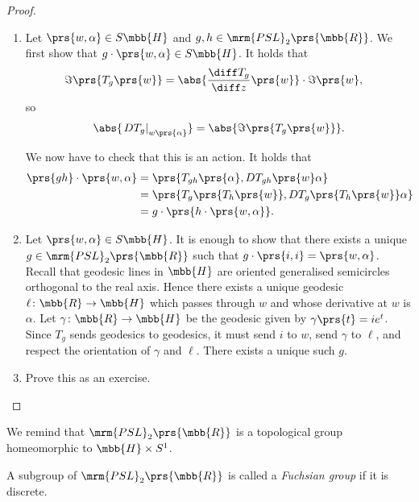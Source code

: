 \documentclass[10pt, twoside]{book}
\begin{document}
\begin{proof}
\begin{enumerate}
\item Let $\prs{w,\alpha} \in S\mbb{H}$ and $g,h \in \mrm{PSL}_2\prs{\mbb{R}}$. We first show that $g \cdot \prs{w,\alpha} \in S\mbb{H}$.
It holds that
\begin{align*}
\Im\prs{T_g\prs{w}} &=
\abs{\frac{\diff T_g}{\diff z}\prs{w}} \cdot \Im\prs{w} \text{,}
\end{align*}
so
\begin{align*}
\abs{\left. D T_g \right|_{w \prs{\alpha}}} = \abs{\Im\prs{T_g\prs{w}}} \text{.}
\end{align*}

We now have to check that this is an action. It holds that
\begin{align*}
\prs{gh} \cdot \prs{w,\alpha} &= \prs{T_{gh}\prs{\alpha}, D T_{gh} \prs{w} \alpha}
\\&= \prs{T_g \prs{T_h\prs{w}}, D T_g \prs{T_h\prs{w}} \alpha}
\\&= g \cdot \prs{h \cdot \prs{w,\alpha}} \text{.}
\end{align*}

\item Let $\prs{w, \alpha} \in S \mbb{H}$. It is enough to show that there exists a unique $g \in \mrm{PSL}_2\prs{\mbb{R}}$ such that $g \cdot \prs{i,i} = \prs{w, \alpha}$. Recall that geodesic lines in $\mbb{H}$ are oriented generalised semicircles orthogonal to the real axis. Hence there exists a unique geodesic $\ell \colon \mbb{R} \to \mbb{H}$ which passes through $w$ and whose derivative at $w$ is $\alpha$.
Let $\gamma \colon \mbb{R} \to \mbb{H}$ be the geodesic given by $\gamma\prs{t} = ie^{t}$. Since $T_g$ sends geodesics to geodesics, it must send $i$ to $w$, send $\gamma$ to $\ell$, and respect the orientation of $\gamma$ and $\ell$. There exists a unique such $g$.

\item Prove this as an exercise.
\end{enumerate}
\end{proof}


We remind that $\mrm{PSL}_2\prs{\mbb{R}}$ is a topological group homeomorphic to $\mbb{H} \times S^1$. 

\begin{definition}
A subgroup of $\mrm{PSL}_2\prs{\mbb{R}}$ is called a \emph{Fuchsian group} if it is discrete.
\end{definition}
\end{document}
